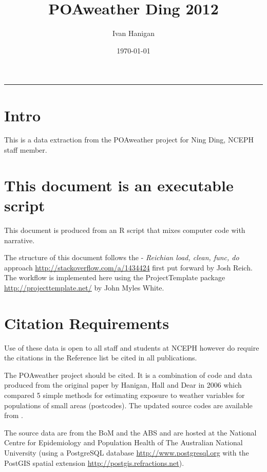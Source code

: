 \documentclass[a4paper]{article}
\title{POAweather Ding 2012}
\author{Ivan Hanigan}
\date{\today}
\begin{document}
\maketitle

\tableofcontents
\hrule
\section{Intro}
\label{sec-1}

This is a data extraction from the POAweather project for Ning Ding, NCEPH staff member.
\section{This document is an executable script}
\label{sec-2}

This document is produced from an R script that mixes computer code with narrative.

The structure of this document follows the - \emph{Reichian load, clean, func, do} approach \href{http://stackoverflow.com/a/1434424}{http://stackoverflow.com/a/1434424} first put forward by Josh Reich.  
The workflow is implemented here using the ProjectTemplate package \href{http://projecttemplate.net/}{http://projecttemplate.net/} by John Myles White.
\section{Citation Requirements}
\label{sec-3}

Use of these data is open to all staff and students at NCEPH however do require the citations in the Reference list be cited in all publications.

The POAweather project should be cited.  It is a combination of code and data produced from the original paper by Hanigan, Hall and Dear in 2006 \cite{Hanigan2006} which compared 5 simple methods for estimating exposure to weather variables for populations of small areas (postcodes).  The updated source codes are available from \cite{Hanigan2012d}.

The source data are from the BoM \cite{NationalClimateCentreoftheBureauofMeteorology2010} and the ABS \cite{AustralianBureauofStatistics2006} and are hosted at the National Centre for Epidemiology and Population Health of The Australian National University  (using a PostgreSQL database \href{http://www.postgresql.org}{http://www.postgresql.org} with the PostGIS spatial extension \href{http://postgis.refractions.net}{http://postgis.refractions.net}).
\end{document}
